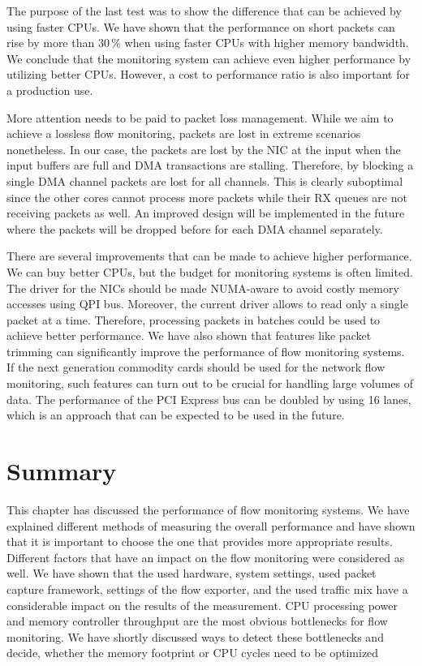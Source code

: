The purpose of the last test was to show the difference that can be achieved by using faster CPUs. We have shown that the performance on short packets can rise by more than 30\,\% when using faster CPUs with higher memory bandwidth. We conclude that the monitoring system can achieve even higher performance by utilizing better CPUs. However, a cost to performance ratio is also important for a production use.

More attention needs to be paid to packet loss management. While we aim to achieve a lossless flow monitoring, packets are lost in extreme scenarios nonetheless. In our case, the packets are lost by the NIC at the input when the input buffers are full and DMA transactions are stalling. Therefore, by blocking a single DMA channel packets are lost for all channels. This is clearly suboptimal since the other cores cannot process more packets while their RX queues are not receiving packets as well. An improved design will be implemented in the future where the packets will be dropped before for each DMA channel separately.

There are several improvements that can be made to achieve higher performance. We can buy better CPUs, but the budget for monitoring systems is often limited. The driver for the NICs should be made NUMA-aware to avoid costly memory accesses using QPI bus. Moreover, the current driver allows to read only a single packet at a time. Therefore, processing packets in batches could be used to achieve better performance. We have also shown that features like packet trimming can significantly improve the performance of flow monitoring systems. If the next generation commodity cards should be used for the network flow monitoring, such features can turn out to be crucial for handling large volumes of data. The performance of the PCI Express bus can be doubled by using 16 lanes, which is an approach that can be expected to be used in the future.

\section{Summary}\label{sec:performance-summary}

This chapter has discussed the performance of flow monitoring systems. We have explained different methods of measuring the overall performance and have shown that it is important to choose the one that provides more appropriate results. Different factors that have an impact on the flow monitoring were considered as well. We have shown that the used hardware, system settings, used packet capture framework, settings of the flow exporter, and the used traffic mix have a considerable impact on the results of the measurement. CPU processing power and memory controller throughput are the most obvious bottlenecks for flow monitoring. We have shortly discussed ways to detect these bottlenecks and decide, whether the memory footprint or CPU cycles need to be optimized

